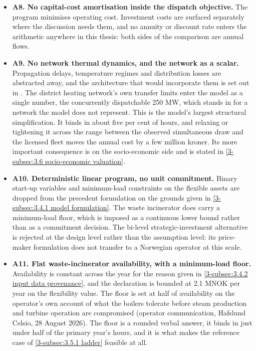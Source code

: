 \begin{itemize}
    \item \textbf{A8. No capital-cost amortisation inside the dispatch objective.} The program minimises operating cost. Investment costs are surfaced separately where the discussion needs them, and no annuity or discount rate enters the arithmetic anywhere in this thesis: both sides of the comparison are annual flows.

    \item \textbf{A9. No network thermal dynamics, and the network as a scalar.} Propagation delays, temperature regimes and distribution losses are abstracted away, and the architecture that would incorporate them is set out in \cite{vandermeulen_controlling_2018}. The district heating network's own transfer limits enter the model as a single number, the concurrently dispatchable 250 MW, which stands in for a network the model does not represent. This is the model's largest structural simplification. It binds in about five per cent of hours, and relaxing or tightening it across the range between the observed simultaneous draw and the licensed fleet moves the annual cost by a few million kroner. Its more important consequence is on the socio-economic side and is stated in \autoref{3-subsec:3.6 socio-economic valuation}.

    \item \textbf{A10. Deterministic linear program, no unit commitment.} Binary start-up variables and minimum-load constraints on the flexible assets are dropped from the precedent formulation \cite{kirkerud_impacts_2016} on the grounds given in \autoref{3-subsec:3.4.1 model formulation}. The waste incinerator does carry a minimum-load floor, which is imposed as a continuous lower bound rather than as a commitment decision. The bi-level strategic-investment alternative \cite{tan_strategic_2022} is rejected at the design level rather than the assumption level: its price-maker formulation does not transfer to a Norwegian operator at this scale.

    \item \textbf{A11. Flat waste-incinerator availability, with a minimum-load floor.} Availability is constant across the year for the reason given in \autoref{3-subsec:3.4.2 input data provenance}, and the declaration is bounded at 2.1 MNOK per year on the flexibility value. The floor is set at half of availability on the operator's own account of what the boilers tolerate before steam production and turbine operation are compromised (operator communication, Hafslund Celsio, 28 August 2026). The floor is a rounded verbal answer, it binds in just under half of the primary year's hours, and it is what makes the reference case of \autoref{3-subsec:3.5.1 ladder} feasible at all.


\end{itemize}
